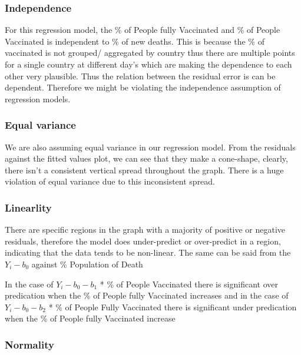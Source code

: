\documentclass[
  12pt,
]{article}
\begin{document}
\hypertarget{independence-1}{%
\subsubsection{Independence}\label{independence-1}}

For this regression model, the \% of People fully Vaccinated and \% of
People Vaccinated is independent to \% of new deaths. This is because
the \% of vaccinated is not grouped/ aggregated by country thus there
are multiple points for a single country at different day's which are
making the dependence to each other very plausible. Thus the relation
between the residual error is can be dependent. Therefore we might be
violating the independence assumption of regression models.

\hypertarget{equal-variance-1}{%
\subsubsection{Equal variance}\label{equal-variance-1}}

We are also assuming equal variance in our regression model. From the
residuals against the fitted values plot, we can see that they make a
cone-shape, clearly, there isn't a consistent vertical spread throughout
the graph. There is a huge violation of equal variance due to this
inconsistent spread.

\hypertarget{linearlity-1}{%
\subsubsection{Linearlity}\label{linearlity-1}}

There are specific regions in the graph with a majority of positive or
negative residuals, therefore the model does under-predict or
over-predict in a region, indicating that the data tends to be
non-linear. The same can be said from the \(Y_i-b_0\) against \%
Population of Death

In the case of \(Y_i - b_0 - b_1\) * \% of People Vaccinated there is
significant over predication when the \% of People fully Vaccinated
increases and in the case of \(Y_i - b_0 - b_2\) * \% of People Fully
Vaccinated there is significant under predication when the \% of People
fully Vaccinated increase

\hypertarget{normality-1}{%
\subsubsection{Normality}\label{normality-1}}
\end{document}
